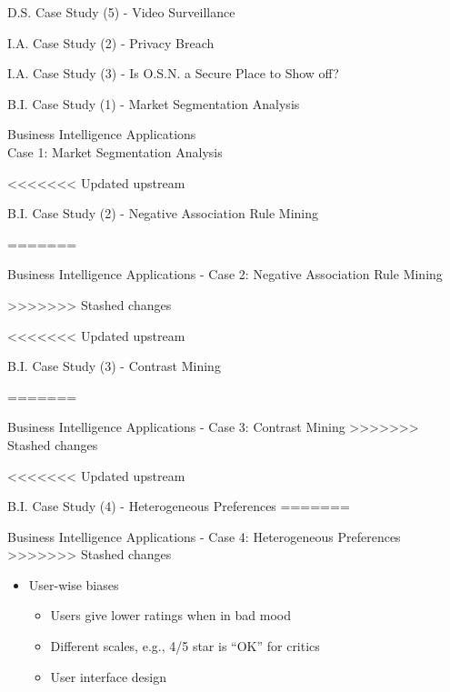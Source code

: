 \documentclass[
 size=14pt,
 paper=smartboard,  %
 mode=present, 		%
 display=slides, 	%
 style=tuliplab,  	%
 pauseslide,
 fleqn,leqno]{powerdot}
\begin{document}
\begin{slide}[toc=,bm=]{D.S. Case Study (5) - Video Surveillance}
\begin{slide}[toc=,bm=]{I.A. Case Study (2) - Privacy Breach}
\begin{slide}[toc=,bm=]{I.A. Case Study (3) - Is O.S.N. a Secure Place to Show off?}
\begin{slide}[toc=,bm=]{B.I. Case Study (1) - Market Segmentation Analysis}
\begin{slide}[toc=,bm=]{Business Intelligence Applications \\
\small{Case 1: Market Segmentation Analysis}}
\end{slide}


<<<<<<< Updated upstream
\begin{slide}[toc=,bm=]{B.I. Case Study (2) - Negative Association Rule Mining}
  
  
  
=======
\begin{slide}[toc=,bm=]{Business Intelligence Applications - Case 2: Negative Association Rule Mining}

>>>>>>> Stashed changes

\end{slide}


<<<<<<< Updated upstream
\begin{slide}[toc=,bm=]{B.I. Case Study (3) - Contrast Mining}

=======
\begin{slide}[toc=,bm=]{Business Intelligence Applications - Case 3: Contrast Mining}
>>>>>>> Stashed changes


\end{slide}


<<<<<<< Updated upstream
\begin{slide}[toc=,bm=]{B.I. Case Study (4) - Heterogeneous Preferences}
=======
\begin{slide}[toc=,bm=]{Business Intelligence Applications - Case 4: Heterogeneous Preferences}
>>>>>>> Stashed changes

\begin{itemize}
\item
User-wise biases

\begin{itemize}
\item
Users give lower ratings when in bad mood

\item
Different scales, e.g., 4/5 star is ``OK'' for critics

\item
User interface design


\end{itemize}
\end{itemize}
\end{slide}
\end{slide}
\end{slide}
\end{slide}
\end{slide}
\end{slide}
\end{slide}
\end{slide}
\end{document}
